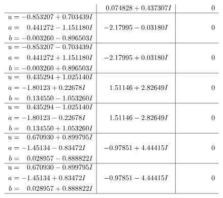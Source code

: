\documentclass[1p]{elsarticle_modified}
\theoremstyle{definition}
\begin{document}
$$\begin{array}{c|c|c}
 & \phantom{-}0.074828 + 0.437307 I & \phantom{-0.000000 } 0 \\ \hline\begin{aligned}
u &= -0.853207 + 0.703439 I \\
a &= \phantom{-}0.441272 - 1.151180 I \\
b &= -0.003260 - 0.896503 I\end{aligned}
 & -2.17995 - 0.03180 I & \phantom{-0.000000 } 0 \\ \hline\begin{aligned}
u &= -0.853207 - 0.703439 I \\
a &= \phantom{-}0.441272 + 1.151180 I \\
b &= -0.003260 + 0.896503 I\end{aligned}
 & -2.17995 + 0.03180 I & \phantom{-0.000000 } 0 \\ \hline\begin{aligned}
u &= \phantom{-}0.435294 + 1.025140 I \\
a &= -1.80123 + 0.22678 I \\
b &= \phantom{-}0.134550 - 1.053260 I\end{aligned}
 & \phantom{-}1.51146 + 2.82649 I & \phantom{-0.000000 } 0 \\ \hline\begin{aligned}
u &= \phantom{-}0.435294 - 1.025140 I \\
a &= -1.80123 - 0.22678 I \\
b &= \phantom{-}0.134550 + 1.053260 I\end{aligned}
 & \phantom{-}1.51146 - 2.82649 I & \phantom{-0.000000 } 0 \\ \hline\begin{aligned}
u &= \phantom{-}0.670930 + 0.899795 I \\
a &= -1.45134 - 0.83472 I \\
b &= \phantom{-}0.028957 - 0.888822 I\end{aligned}
 & -0.97851 + 4.44415 I & \phantom{-0.000000 } 0 \\ \hline\begin{aligned}
u &= \phantom{-}0.670930 - 0.899795 I \\
a &= -1.45134 + 0.83472 I \\
b &= \phantom{-}0.028957 + 0.888822 I\end{aligned}
 & -0.97851 - 4.44415 I & \phantom{-0.000000 } 0\\
 \hline 
 \end{array}$$\newpage$$\begin{array}{c|c|c}  

\end{array}$$
\end{document}
